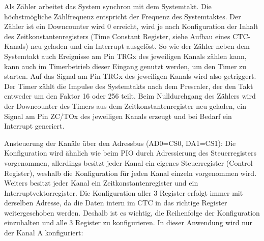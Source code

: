 Als Zähler arbeitet das System synchron mit dem Systemtakt. Die höchstmögliche Zählfrequenz entspricht der Frequenz des Systemtaktes. Der Zähler ist ein Downcounter wird 0 erreicht, wird je nach Konfiguration der Inhalt des Zeitkonstantenregisters (Time Constant Register, siehe Aufbau eines CTC-Kanals) neu geladen und ein Interrupt ausgelöst. So wie der Zähler neben dem Systemtakt auch Ereignisse am Pin TRGx des jeweiligen Kanals zählen kann, kann auch im Timerbetrieb dieser Eingang genutzt werden, um den Timer zu starten. Auf das Signal am Pin TRGx des jeweiligen Kanals wird also getriggert. Der Timer zählt die Impulse des Systemtakts nach dem Prescaler, der den Takt entweder um den Faktor 16 oder 256 teilt. Beim Nulldurchgang des Zählers wird der Downcounter des Timers aus dem Zeitkonstantenregister neu geladen, ein Signal am Pin ZC/TOx des jeweiligen Kanals erzeugt und bei Bedarf ein Interrupt generiert.


Ansteuerung der Kanäle über den Adressbus (AD0=CS0, DA1=CS1):
Die Konfiguration wird ähnlich wie beim PIO durch Adressierung des Steuerregisters vorgenommen, allerdings besitzt jeder Kanal ein eigenes Steuerregister (Control Register), weshalb die Konfiguration für jeden Kanal einzeln vorgenommen wird. Weiters besitzt jeder Kanal ein Zeitkonstantenregister und ein Interruptvektorregister. Die Konfiguration aller 3 Register erfolgt immer mit derselben Adresse, da die Daten intern im CTC in das richtige Register weitergeschoben werden. Deshalb ist es wichtig, die Reihenfolge der Konfiguration einzuhalten und alle 3 Register zu konfigurieren.
In dieser Anwendung wird nur der Kanal A konfiguriert:


